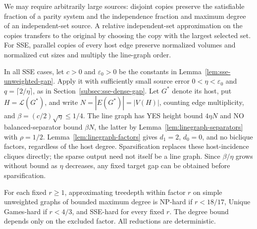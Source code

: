 We may require arbitrarily large sources: disjoint copies preserve the satisfiable fraction
of a parity system and the independence fraction and maximum degree
of an independent-set source. A relative independent-set
approximation on the copies transfers to the original by choosing
the copy with the largest selected set. For SSE, parallel copies
of every host edge preserve normalized volumes and normalized cut sizes and
multiply the line-graph order.

In all SSE cases, let $c>0$ and $\varepsilon_0>0$ be the constants
in Lemma~\ref{lem:sse-unweighted-gap}. Apply it with sufficiently
small source error $0<\eta<\varepsilon_0$ and
$q=\lceil2/\eta\rceil$, as in Section~\ref{subsec:sse-dense-gap}.
Let $G^*$ denote its host, put $H=\mathcal L(G^*)$, and write
$N=|E(G^*)|=|V(H)|$, counting edge multiplicity, and
$\beta=(c/2)\sqrt\eta\le1/4$.
The line graph has YES height bound $4\eta N$ and NO balanced-separator
bound $\beta N$, the latter by
Lemma~\ref{lem:linegraph-separators} with $\rho=1/2$.
Lemma~\ref{lem:linegraph-factors} gives $d_1=2$, $d_0=0$, and no
biclique factors, regardless of the host degree. Sparsification
replaces these host-incidence cliques directly; the sparse output
need not itself be a line graph. Since $\beta/\eta$ grows
without bound as $\eta$ decreases, any fixed target gap can be
obtained before sparsification.

\begin{corollary}
\label{cor:td-bounded-degree}
\label{thm:np-bounded-degree}
\label{thm:ugc-bounded-degree}
\label{thm:sse-bounded-degree}
For each fixed $r\ge1$, approximating treedepth within factor $r$
on simple unweighted graphs of bounded maximum degree is
NP-hard if $r<18/17$, Unique Games-hard if $r<4/3$, and
SSE-hard for every fixed $r$.
The degree bound depends only on the excluded factor. All reductions
are deterministic.
\end{corollary}

